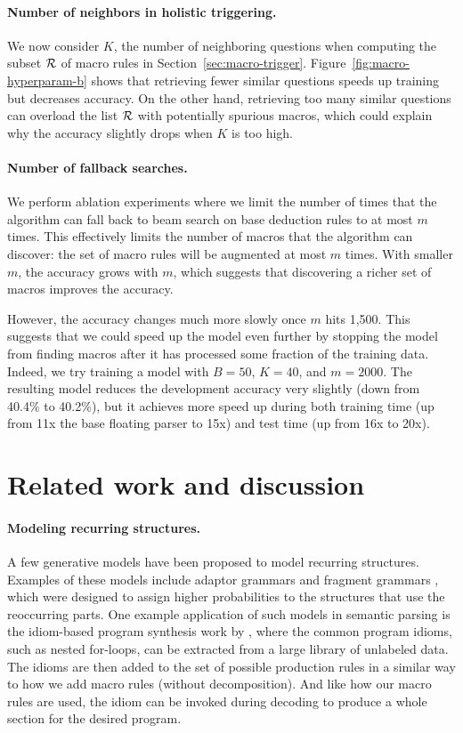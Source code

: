 \paragraph{Number of neighbors in holistic triggering.}
We now consider $K$,
the number of neighboring questions
when computing the subset $\mathcal{R}$ of macro rules
in Section~\ref{sec:macro-trigger}.
Figure~\ref{fig:macro-hyperparam-b}
shows that retrieving fewer similar questions
speeds up training but decreases accuracy.
On the other hand,
retrieving too many similar questions
can overload the list $\mathcal{R}$
with potentially spurious macros,
which could explain why the accuracy
slightly drops when $K$ is too high.

\paragraph{Number of fallback searches.}
We perform ablation experiments
where we limit the number of times
that the algorithm can fall back to 
beam search on base deduction rules to at most $m$ times.
This effectively limits the number of macros
that the algorithm can discover:
the set of macro rules will be augmented 
at most $m$ times.
With smaller $m$, the accuracy grows with $m$,
which suggests that discovering a richer set of macros
improves the accuracy.

However, the accuracy changes much more slowly
once $m$ hits 1,500.
This suggests that we could speed up the model
even further by stopping the model from
finding macros after it has processed
some fraction of the training data.
Indeed, we try training a model with $B = 50$,
$K = 40$, and $m = 2000$.
The resulting model reduces the development accuracy
very slightly (down from 40.4\% to 40.2\%),
but it achieves more speed up during both training time
(up from 11x the base floating parser to 15x)
and test time
(up from 16x to 20x).

\section{Related work and discussion}

\paragraph{Modeling recurring structures.}
A few generative models have been proposed
to model recurring structures.
Examples of these models include adaptor grammars
\cite{johnson06adaptor}
and fragment grammars
\cite{odonnell11fragment},
which were designed to assign
higher probabilities to the structures
that use the reoccurring parts.
One example application of such models in semantic parsing
is the idiom-based program synthesis work by \citet{iyer2019learning},
where the common program idioms,
such as nested for-loops,
can be extracted from a large
library of unlabeled data.
The idioms are then added to the set of possible
production rules in a similar way to how
we add macro rules (without decomposition).
And like how our macro rules are used,
the idiom can be invoked during decoding
to produce a whole section for the desired program.

